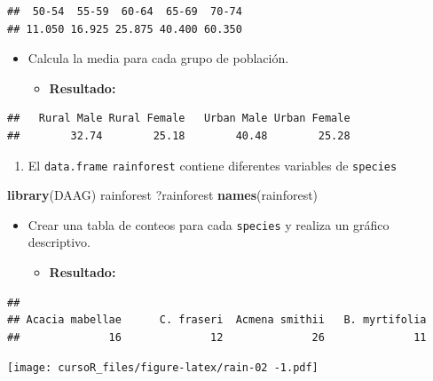 \documentclass[]{book}
\newenvironment{Shaded}{\begin{snugshade}}{\end{snugshade}}
\newcommand{\KeywordTok}[1]{\textcolor[rgb]{0.13,0.29,0.53}{\textbf{#1}}}
\newcommand{\NormalTok}[1]{#1}
\providecommand{\tightlist}{%
  \setlength{\itemsep}{0pt}\setlength{\parskip}{0pt}}
\begin{document}
\begin{verbatim}
##  50-54  55-59  60-64  65-69  70-74 
## 11.050 16.925 25.875 40.400 60.350
\end{verbatim}

\begin{itemize}
\item
  Calcula la media para cada grupo de población.

  \begin{itemize}
  \tightlist
  \item
    \textbf{Resultado:}
  \end{itemize}
\end{itemize}

\begin{verbatim}
##   Rural Male Rural Female   Urban Male Urban Female 
##        32.74        25.18        40.48        25.28
\end{verbatim}

\begin{enumerate}
\def\labelenumi{\arabic{enumi}.}
\setcounter{enumi}{1}
\tightlist
\item
  El \texttt{data.frame} \texttt{rainforest} contiene diferentes
  variables de \texttt{species}
\end{enumerate}

\begin{Shaded}
\begin{Highlighting}[]
\KeywordTok{library}\NormalTok{(DAAG)}
\NormalTok{rainforest}
\NormalTok{?rainforest}
\KeywordTok{names}\NormalTok{(rainforest)}
\end{Highlighting}
\end{Shaded}

\begin{itemize}
\item
  Crear una tabla de conteos para cada \texttt{species} y realiza un
  gráfico descriptivo.

  \begin{itemize}
  \tightlist
  \item
    \textbf{Resultado:}
  \end{itemize}
\end{itemize}

\begin{verbatim}
## 
## Acacia mabellae      C. fraseri  Acmena smithii   B. myrtifolia 
##              16              12              26              11
\end{verbatim}

\texttt{[image: cursoR\_files/figure-latex/rain-02 -1.pdf]}
\end{document}
